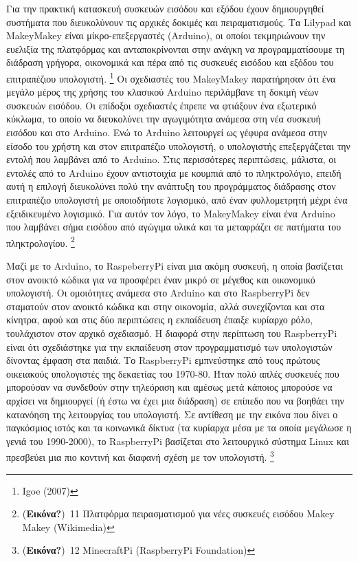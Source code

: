 \documentclass[
]{article}
\begin{document}
Για την πρακτική κατασκευή συσκευών εισόδου και εξόδου έχουν
δημιουργηθεί συστήματα που διευκολύνουν τις αρχικές δοκιμές και
πειραματισμούς. Τα Lilypad και MakeyMakey είναι μίκρο-επεξεργαστές
(Arduino), οι οποίοι τεκμηριώνουν την ευελιξία της πλατφόρμας και
ανταποκρίνονται στην ανάγκη να προγραμματίσουμε τη διάδραση γρήγορα,
οικονομικά και πέρα από τις συσκευές εισόδου και εξόδου του επιτραπέζιου
υπολογιστή. \footnote{Igoe (2007)} Οι σχεδιαστές του MakeyMakey
παρατήρησαν ότι ένα μεγάλο μέρος της χρήσης του κλασικού Arduino
περιλάμβανε τη δοκιμή νέων συσκευών εισόδου. Οι επίδοξοι σχεδιαστές
έπρεπε να φτιάξουν ένα εξωτερικό κύκλωμα, το οποίο να διευκολύνει την
αγωγιμότητα ανάμεσα στη νέα συσκευή εισόδου και στο Arduino. Ενώ το
Arduino λειτουργεί ως γέφυρα ανάμεσα στην είσοδο του χρήστη και στον
επιτραπέζιο υπολογιστή, ο υπολογιστής επεξεργάζεται την εντολή που
λαμβάνει από το Arduino. Στις περισσότερες περιπτώσεις, μάλιστα, οι
εντολές από το Arduino έχουν αντιστοιχία με κουμπιά από το πληκτρολόγιο,
επειδή αυτή η επιλογή διευκολύνει πολύ την ανάπτυξη του προγράμματος
διάδρασης στον επιτραπέζιο υπολογιστή με οποιοδήποτε λογισμικό, από έναν
φυλλομετρητή μέχρι ένα εξειδικευμένο λογισμικό. Για αυτόν τον λόγο, το
MakeyMakey είναι ένα Arduino που λαμβάνει σήμα εισόδου από αγώγιμα υλικά
και τα μεταφράζει σε πατήματα του πληκτρολογίου. \footnote{(\textbf{Εικόνα?})~11
  Πλατφόρμα πειρασματισμού για νέες συσκευές εισόδου Makey Makey
  (Wikimedia)}

Μαζί με το Arduino, το RaspeberryPi είναι μια ακόμη συσκευή, η οποία
βασίζεται στον ανοικτό κώδικα για να προσφέρει έναν μικρό σε μέγεθος και
οικονομικό υπολογιστή. Οι ομοιότητες ανάμεσα στο Arduino και στο
RaspberryPi δεν σταματούν στον ανοικτό κώδικα και στην οικονομία, αλλά
συνεχίζονται και στα κίνητρα, αφού και στις δύο περιπτώσεις η εκπαίδευση
έπαιξε κυρίαρχο ρόλο, τουλάχιστον στον αρχικό σχεδιασμό. Η διαφορά στην
περίπτωση του RaspberryPi είναι ότι σχεδιάστηκε για την εκπαίδευση στον
προγραμματισμό των υπολογιστών δίνοντας έμφαση στα παιδιά. Το
RaspberryPi εμπνεύστηκε από τους πρώτους οικειακούς υπολογιστές της
δεκαετίας του 1970-80. Ήταν πολύ απλές συσκευές που μπορούσαν να
συνδεθούν στην τηλεόραση και αμέσως μετά κάποιος μπορούσε να αρχίσει να
δημιουργεί (ή έστω να έχει μια διάδραση) σε επίπεδο που να βοηθάει την
κατανόηση της λειτουργίας του υπολογιστή. Σε αντίθεση με την εικόνα που
δίνει ο παγκόσμιος ιστός και τα κοινωνικά δίκτυα (τα κυρίαρχα μέσα με τα
οποία μεγάλωσε η γενιά του 1990-2000), το RaspberryPi βασίζεται στο
λειτουργικό σύστημα Linux και πρεσβεύει μια πιο κοντινή και διαφανή
σχέση με τον υπολογιστή. \footnote{(\textbf{Εικόνα?})~12 MinecraftPi
  (RaspberryPi Foundation)}
\end{document}
